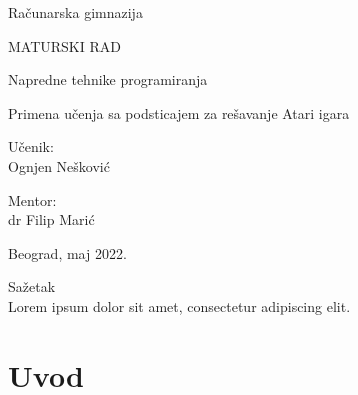 \documentclass[a4paper,fleqn,12pt]{JMThesis}
\renewcommand{\ch}{\v c}
\renewcommand{\sh}{\v s}
\newcommand{\zh}{\v z}
\theoremstyle{plain}
\theoremstyle{definition}
\theoremstyle{definition}
\begin{document}

\thispagestyle{empty}

\begin{center}
{\LARGE Ra\ch unarska gimnazija}
\end{center}
\vspace*{50mm}

\begin{center}
{\huge MATURSKI RAD}

\vspace*{8pt}
{\Large Napredne tehnike programiranja}
\end{center}

\vspace*{10pt}
\begin{center}
{\LARGE Primena u\ch enja sa podsticajem za re\sh avanje Atari igara}
\end{center}

\vspace*{70mm}
\setlength{\columnsep}{50pt}
\begin{multicols}{2}
 {\noindent \Large Učenik:
\\Ognjen Ne\sh ković}


{ \noindent \hfill \Large Mentor:\\
\hfill \phantom{aaaaaaaaa}  dr Filip Marić}
\end{multicols}

\vfill
\begin{center}
{\Large Beograd, maj 2022.}
\end{center}

\newpage

\renewcommand{\chaptername}{}
\setcounter{page}{1}
\thispagestyle{plain}
{\Large Sa\zh etak}\\ 
Lorem ipsum dolor sit amet, consectetur adipiscing elit.

\chapter[Uvod]{Uvod}
\thispagestyle{plain}
\end{document}
